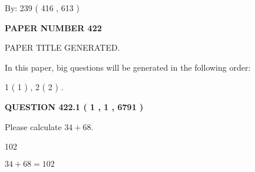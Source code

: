 \documentclass[12pt]{article}
\begin{document}
   
\hspace{1.0in} By: 
 239 ( 416 ,  613 )
   
   
   
   
\newpage 
\setcounter{page}{ 
   422001 } 
   
   
   
   
 {\textbf{ \Large{ PAPER NUMBER  422  }}}
   
   
\vspace{0.2in}
   
   
   
   
   
   
   
   
 \vspace{0.2in}
 
 
 
 
   
   
 PAPER TITLE GENERATED.
   
   
   
\vspace{0.2in}
   
In this paper, big questions will be generated in the following order: 
   
   
   1 ( 1 )
 ,
   2 ( 2 )
 .
  
\vspace{0.2in}
  
{\textbf{\Large{QUESTION
422.1 
 ( 1 , 1 , 6791 )
}}}
  
  
 
Please calculate $ %
34 +  %
68 $.
 
 
 
\noindent{}
 
 

102
 
 
\noindent{}
 
 

 
 
 
\noindent{}
 
 

$ %
34 +  %
68=   %
102$
 
 
\noindent{}
 
\end{document}
